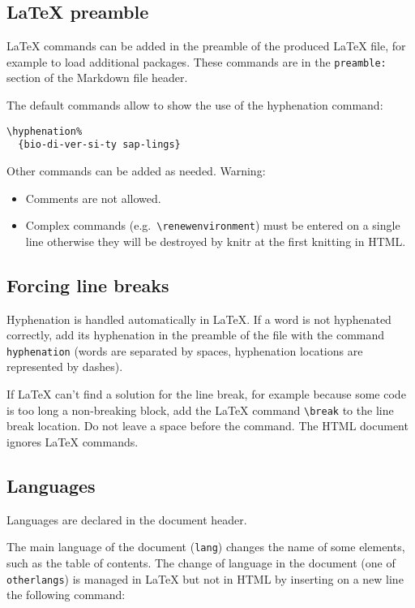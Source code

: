 \documentclass[fleqn,10pt]{latex/stylish_article} %
\providecommand{\tightlist}{%
  \setlength{\itemsep}{0pt}\setlength{\parskip}{0pt}}
\begin{document}
\subsection{LaTeX preamble}\label{latex-preamble}

LaTeX commands can be added in the preamble of the produced LaTeX file, for example to load additional packages.
These commands are in the \texttt{preamble:} section of the Markdown file header.

The default commands allow to show the use of the hyphenation command:

\begin{verbatim}
\hyphenation%
  {bio-di-ver-si-ty sap-lings}
\end{verbatim}

Other commands can be added as needed.
Warning:

\begin{itemize}
\tightlist
\item
  Comments are not allowed.
\item
  Complex commands (e.g.~\texttt{\textbackslash{}renewenvironment}) must be entered on a single line otherwise they will be destroyed by knitr at the first knitting in HTML.
\end{itemize}

\subsection{Forcing line breaks}\label{forcing-line-breaks}

Hyphenation is handled automatically in LaTeX.
If a word is not hyphenated correctly, add its hyphenation in the preamble of the file with the command \texttt{hyphenation} (words are separated by spaces, hyphenation locations are represented by dashes).

If LaTeX can't find a solution for the line break, for example because some code is too long a non-breaking block, add the LaTeX command \texttt{\textbackslash{}break} to the line break location.
Do not leave a space before the command.
The HTML document ignores LaTeX commands.

\subsection{Languages}\label{languages}

Languages are declared in the document header.

The main language of the document (\texttt{lang}) changes the name of some elements, such as the table of contents.
The change of language in the document (one of \texttt{otherlangs}) is managed in LaTeX but not in HTML by inserting on a new line the following command:
\end{document}
